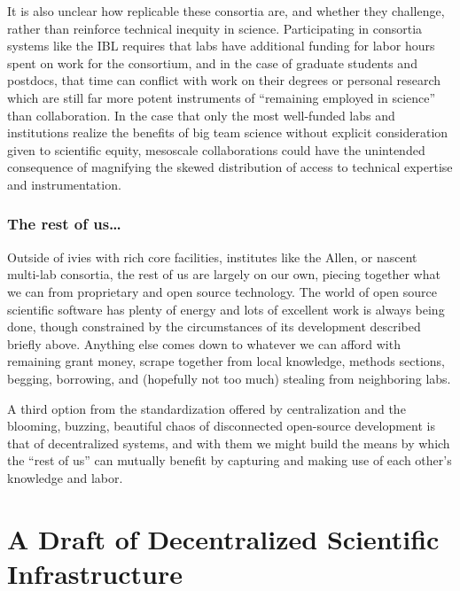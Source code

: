 \documentclass[11pt]{article}
\begin{document}
\begin{multicols}{2}
It is also unclear how replicable these consortia are, and whether they
challenge, rather than reinforce technical inequity in science.
Participating in consortia systems like the IBL requires that labs have
additional funding for labor hours spent on work for the consortium, and
in the case of graduate students and postdocs, that time can conflict
with work on their degrees or personal research which are still far more
potent instruments of ``remaining employed in science'' than
collaboration. In the case that only the most well-funded labs and
institutions realize the benefits of big team science without explicit
consideration given to scientific equity, mesoscale collaborations could
have the unintended consequence of magnifying the skewed distribution of
access to technical expertise and instrumentation.

\hypertarget{the-rest-of-us}{%
\subsubsection{The rest of us\ldots{}}\label{the-rest-of-us}}

Outside of ivies with rich core facilities, institutes like the Allen,
or nascent multi-lab consortia, the rest of us are largely on our own,
piecing together what we can from proprietary and open source
technology. The world of open source scientific software has plenty of
energy and lots of excellent work is always being done, though
constrained by the circumstances of its development described briefly
above. Anything else comes down to whatever we can afford with remaining
grant money, scrape together from local knowledge, methods sections,
begging, borrowing, and (hopefully not too much) stealing from
neighboring labs.

A third option from the standardization offered by centralization and
the blooming, buzzing, beautiful chaos of disconnected open-source
development is that of decentralized systems, and with them we might
build the means by which the ``rest of us'' can mutually benefit by
capturing and making use of each other's knowledge and labor.

\end{multicols}


\hypertarget{a-draft-of-decentralized-scientific-infrastructure}{%
\section{A Draft of Decentralized Scientific
Infrastructure}\label{a-draft-of-decentralized-scientific-infrastructure}}
\end{document}
